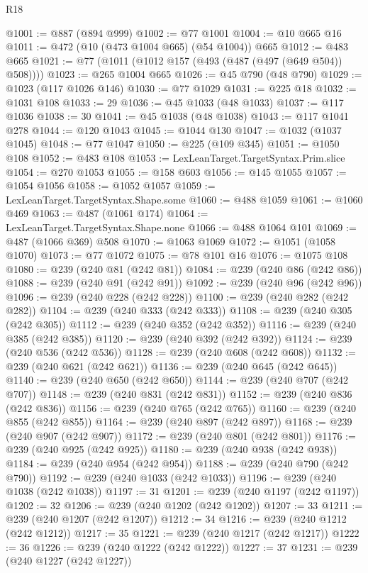 \begin{lexlean}{R18}
\begin{coremodule}
@1001 := @887 (@894 @999)
@1002 := @77 @1001
@1004 := @10 @665 @16
@1011 := @472 (@10 (@473 @1004 @665) (@54 @1004)) @665
@1012 := @483 @665
@1021 := @77 (@1011 (@1012 @157 (@493 (@487 (@497 (@649 @504)) @508))))
@1023 := @265 @1004 @665
@1026 := @45 @790 (@48 @790)
@1029 := @1023 (@117 @1026 @146)
@1030 := @77 @1029
@1031 := @225 @18
@1032 := @1031 @108
@1033 := 29
@1036 := @45 @1033 (@48 @1033)
@1037 := @117 @1036
@1038 := 30
@1041 := @45 @1038 (@48 @1038)
@1043 := @117 @1041 @278
@1044 := @120 @1043
@1045 := @1044 @130
@1047 := @1032 (@1037 @1045)
@1048 := @77 @1047
@1050 := @225 (@109 @345)
@1051 := @1050 @108
@1052 := @483 @108
@1053 := LexLeanTarget.TargetSyntax.Prim.slice
@1054 := @270 @1053
@1055 := @158 @603
@1056 := @145 @1055
@1057 := @1054 @1056
@1058 := @1052 @1057
@1059 := LexLeanTarget.TargetSyntax.Shape.some
@1060 := @488 @1059
@1061 := @1060 @469
@1063 := @487 (@1061 @174)
@1064 := LexLeanTarget.TargetSyntax.Shape.none
@1066 := @488 @1064 @101
@1069 := @487 (@1066 @369) @508
@1070 := @1063 @1069
@1072 := @1051 (@1058 @1070)
@1073 := @77 @1072
@1075 := @78 @101 @16
@1076 := @1075 @108
@1080 := @239 (@240 @81 (@242 @81))
@1084 := @239 (@240 @86 (@242 @86))
@1088 := @239 (@240 @91 (@242 @91))
@1092 := @239 (@240 @96 (@242 @96))
@1096 := @239 (@240 @228 (@242 @228))
@1100 := @239 (@240 @282 (@242 @282))
@1104 := @239 (@240 @333 (@242 @333))
@1108 := @239 (@240 @305 (@242 @305))
@1112 := @239 (@240 @352 (@242 @352))
@1116 := @239 (@240 @385 (@242 @385))
@1120 := @239 (@240 @392 (@242 @392))
@1124 := @239 (@240 @536 (@242 @536))
@1128 := @239 (@240 @608 (@242 @608))
@1132 := @239 (@240 @621 (@242 @621))
@1136 := @239 (@240 @645 (@242 @645))
@1140 := @239 (@240 @650 (@242 @650))
@1144 := @239 (@240 @707 (@242 @707))
@1148 := @239 (@240 @831 (@242 @831))
@1152 := @239 (@240 @836 (@242 @836))
@1156 := @239 (@240 @765 (@242 @765))
@1160 := @239 (@240 @855 (@242 @855))
@1164 := @239 (@240 @897 (@242 @897))
@1168 := @239 (@240 @907 (@242 @907))
@1172 := @239 (@240 @801 (@242 @801))
@1176 := @239 (@240 @925 (@242 @925))
@1180 := @239 (@240 @938 (@242 @938))
@1184 := @239 (@240 @954 (@242 @954))
@1188 := @239 (@240 @790 (@242 @790))
@1192 := @239 (@240 @1033 (@242 @1033))
@1196 := @239 (@240 @1038 (@242 @1038))
@1197 := 31
@1201 := @239 (@240 @1197 (@242 @1197))
@1202 := 32
@1206 := @239 (@240 @1202 (@242 @1202))
@1207 := 33
@1211 := @239 (@240 @1207 (@242 @1207))
@1212 := 34
@1216 := @239 (@240 @1212 (@242 @1212))
@1217 := 35
@1221 := @239 (@240 @1217 (@242 @1217))
@1222 := 36
@1226 := @239 (@240 @1222 (@242 @1222))
@1227 := 37
@1231 := @239 (@240 @1227 (@242 @1227))

\end{coremodule}
\end{lexlean}
